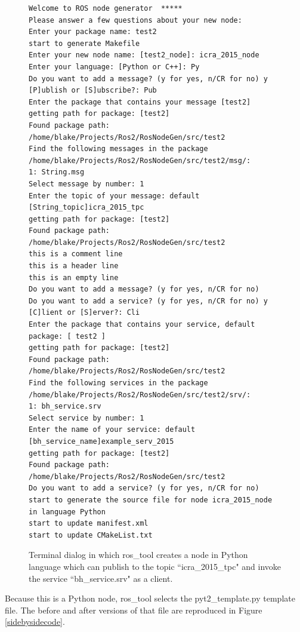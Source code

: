 \documentclass[letterpaper, 10 pt, conference]{ieeeconf}  %
\begin{document}
\begin{figure}
{\small
\begin{verbatim}
Welcome to ROS node generator  *****
Please answer a few questions about your new node:
Enter your package name: test2
start to generate Makefile
Enter your new node name: [test2_node]: icra_2015_node
Enter your language: [Python or C++]: Py
Do you want to add a message? (y for yes, n/CR for no) y
[P]ublish or [S]ubscribe?: Pub
Enter the package that contains your message [test2]
getting path for package: [test2]
Found package path: /home/blake/Projects/Ros2/RosNodeGen/src/test2
Find the following messages in the package /home/blake/Projects/Ros2/RosNodeGen/src/test2/msg/:
1: String.msg
Select message by number: 1
Enter the topic of your message: default [String_topic]icra_2015_tpc
getting path for package: [test2]
Found package path: /home/blake/Projects/Ros2/RosNodeGen/src/test2
this is a comment line
this is a header line
this is an empty line
Do you want to add a message? (y for yes, n/CR for no)
Do you want to add a service? (y for yes, n/CR for no) y
[C]lient or [S]erver?: Cli
Enter the package that contains your service, default package: [ test2 ]
getting path for package: [test2]
Found package path: /home/blake/Projects/Ros2/RosNodeGen/src/test2
Find the following services in the package /home/blake/Projects/Ros2/RosNodeGen/src/test2/srv/:
1: bh_service.srv
Select service by number: 1
Enter the name of your service: default [bh_service_name]example_serv_2015
getting path for package: [test2]
Found package path: /home/blake/Projects/Ros2/RosNodeGen/src/test2
Do you want to add a service? (y for yes, n/CR for no)
start to generate the source file for node icra_2015_node in language Python
start to update manifest.xml
start to update CMakeList.txt
\end{verbatim}
}
\caption{Terminal dialog in which ros\_tool creates a node in Python language which can publish to the topic ``icra\_2015\_tpc" and invoke the service ``bh\_service.srv" as a client.}\label{dialogexample}
\end{figure}

Because this is a Python node, ros\_tool selects  the pyt2\_template.py template file.  The before and after versions of that file are reproduced in Figure \ref{sidebysidecode}.
\end{document}
